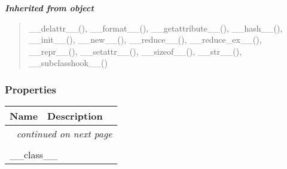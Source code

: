 \large{\textbf{\textit{Inherited from object}}}

\begin{quote}
\_\_delattr\_\_(), \_\_format\_\_(), \_\_getattribute\_\_(), \_\_hash\_\_(), \_\_init\_\_(), \_\_new\_\_(), \_\_reduce\_\_(), \_\_reduce\_ex\_\_(), \_\_repr\_\_(), \_\_setattr\_\_(), \_\_sizeof\_\_(), \_\_str\_\_(), \_\_subclasshook\_\_()
\end{quote}


  \subsubsection{Properties}

    \vspace{-1cm}
\hspace{\varindent}\begin{longtable}{|p{\varnamewidth}|p{\vardescrwidth}|l}
\cline{1-2}
\cline{1-2} \centering \textbf{Name} & \centering \textbf{Description}& \\
\cline{1-2}
\endhead\cline{1-2}\multicolumn{3}{r}{\small\textit{continued on next page}}\\\endfoot\cline{1-2}
\endlastfoot\multicolumn{2}{|l|}{\textit{Inherited from object}}\\
\multicolumn{2}{|p{\varwidth}|}{\raggedright \_\_class\_\_}\\
\cline{1-2}
\end{longtable}

